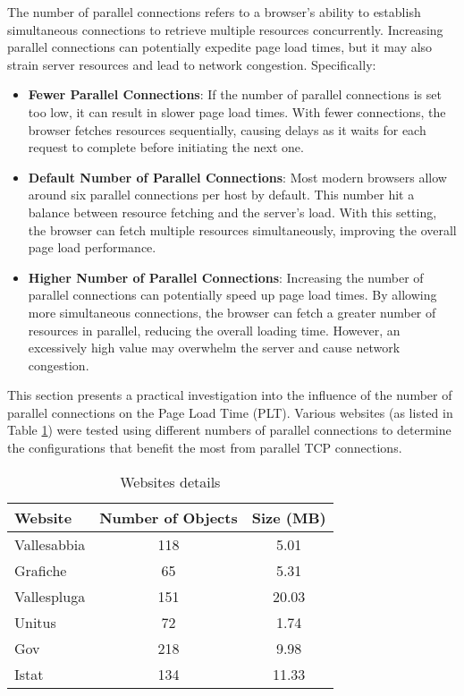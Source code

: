 The number of parallel connections refers to a browser's ability to establish simultaneous connections to retrieve 
multiple resources concurrently. Increasing parallel connections can potentially expedite page load times, but it may 
also strain server resources and lead to network congestion. Specifically:

\begin{itemize}[leftmargin=10pt]
\item \textbf{Fewer Parallel Connections}: If the number of parallel connections is set too low, it can result in
 slower page load times. With fewer connections, the browser fetches resources sequentially, causing delays as it waits
 for each request to complete before initiating the next one.
\item \textbf{Default Number of Parallel Connections}: Most modern browsers allow around six parallel connections per
 host by default. This number hit a balance between resource fetching and the server's load. With this setting, the 
 browser can fetch multiple resources simultaneously, improving the overall page load performance. 
\item \textbf{Higher Number of Parallel Connections}: Increasing the number of parallel connections can potentially
 speed up page load times. By allowing more simultaneous connections, the browser can fetch a greater number of 
 resources in parallel, reducing the overall loading time. However, an excessively high value may overwhelm the 
 server and cause network congestion.
\end{itemize}
\noindent
This section presents a practical investigation into the influence of the number of parallel connections on the Page Load Time (PLT). 
Various websites (as listed in Table \ref{tab:websites_details}) were tested using different numbers of parallel connections 
to determine the configurations that benefit the most from parallel TCP connections.

    \begin{table}[H]
    \centering
        \begin{tabular}{|l|c|c|}
        \hline
        \rowcolor{pyblue!60}
        \textbf{Website} & \textbf{Number of Objects} & \textbf{Size (MB)} \\
        \hline
        Vallesabbia & 118 & 5.01 \\
        Grafiche & 65 & 5.31 \\
        Vallespluga & 151 & 20.03 \\
        Unitus & 72 & 1.74 \\
        Gov & 218 & 9.98 \\
        Istat & 134 & 11.33 \\
        \hline
        \end{tabular}
        \caption{\small Websites details}
        \label{tab:websites_details}
    \end{table}


